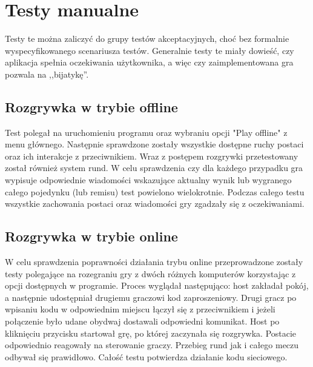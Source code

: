 \section{Testy manualne}
Testy te można zaliczyć do grupy testów akceptacyjnych, choć bez formalnie wyspecyfikowanego scenariusza testów. Generalnie testy te miały dowieść, czy aplikacja spełnia oczekiwania użytkownika, a więc czy zaimplementowana gra pozwala na ,,bijatykę''.
\subsection{Rozgrywka w trybie offline}
Test polegał na uruchomieniu programu oraz wybraniu opcji "Play offline" z menu głównego. Następnie sprawdzone zostały wszystkie dostępne ruchy postaci oraz ich interakcje z przeciwnikiem. Wraz z postępem rozgrywki przetestowany został również system rund. W celu sprawdzenia czy dla każdego przypadku gra wypisuje odpowiednie wiadomości wskazujące aktualny wynik lub wygranego całego pojedynku (lub remisu) test powielono wielokrotnie. Podczas całego testu wszystkie zachowania postaci oraz wiadomości gry zgadzały się z oczekiwaniami.

\subsection{Rozgrywka w trybie online}
W celu sprawdzenia poprawności działania trybu online przeprowadzone zostały testy polegające na rozegraniu gry z dwóch różnych komputerów korzystając z opcji dostępnych w programie. Proces wyglądał następująco: host zakładał pokój, a następnie udostępniał drugiemu graczowi kod zaproszeniowy. Drugi gracz po wpisaniu kodu w odpowiednim miejscu łączył się z przeciwnikiem i jeżeli połączenie było udane obydwaj dostawali odpowiedni komunikat. Host po kliknięciu przycisku startował grę, po której zaczynała się rozgrywka. Postacie odpowiednio reagowały na sterowanie graczy. Przebieg rund jak i całego meczu odbywał się prawidłowo. Całość testu potwierdza działanie kodu sieciowego.




